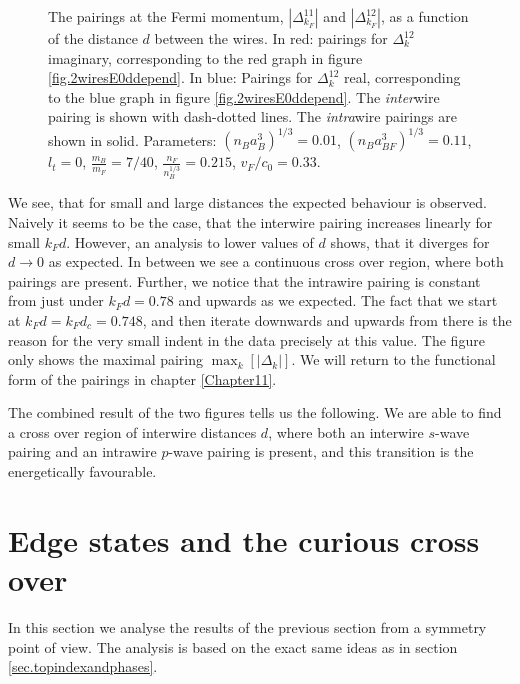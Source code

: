 \begin{figure} 
\begin{center}  
  
\caption{The pairings at the Fermi momentum, $\left|\Delta^{11}_{k_F}\right|$ and $\left|\Delta^{12}_{k_F}\right|$, as a function of the distance $d$ between the wires. In red: pairings for $\Delta^{12}_k$ imaginary, corresponding to the red graph in figure \ref{fig.2wiresE0ddepend}. In blue: Pairings for $\Delta^{12}_k$ real, corresponding to the blue graph in figure \ref{fig.2wiresE0ddepend}. The \textit{inter}wire pairing is shown with dash-dotted lines. The \textit{intra}wire pairings are shown in solid. Parameters: $(n_Ba_B^3)^{1/3} = 0.01$, $(n_Ba_{BF}^3)^{1/3} = 0.11$, $l_t = 0$, $\frac{m_B}{m_F} = 7/40$, $\frac{n_F}{n_B^{1/3}} = 0.215$, $v_F/c_0 = 0.33$. }  
\label{fig.2wiresMaximalPairingddepend}  
\end{center}    
\end{figure}
 
We see, that for small and large distances the expected behaviour is observed. Naively it seems to be the case, that the interwire pairing increases linearly for small $k_Fd$. However, an analysis to lower values of $d$ shows, that it diverges for $d \to 0$ as expected. In between we see a continuous cross over region, where both pairings are present. Further, we notice that the intrawire pairing is constant from just under $k_Fd = 0.78$ and upwards as we expected. The fact that we start at $k_Fd = k_Fd_c = 0.748$, and then iterate downwards and upwards from there is the reason for the very small indent in the data precisely at this value. The figure only shows the maximal pairing $\max_k[|\Delta_k|]$. We will return to the functional form of the pairings in chapter \ref{Chapter11}.

The combined result of the two figures tells us the following. We are able to find a cross over region of interwire distances $d$, where both an interwire $s$-wave pairing and an intrawire $p$-wave pairing is present, and this transition is the energetically favourable. 

\section{Edge states and the curious cross over}
\label{sec.2wiresedgestates_crossover_topology}
In this section we analyse the results of the previous section from a symmetry point of view. The analysis is based on the exact same ideas as in section \ref{sec.topindexandphases}. 

